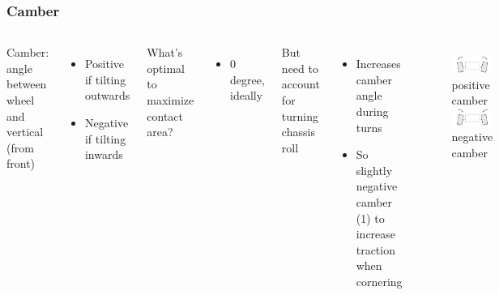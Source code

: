 \documentclass{beamer}
\begin{document}
\begin{frame}
\frametitle{Camber}
\begin{columns}[t]
  Camber: angle between wheel and vertical (from front)
  \begin{itemize}
    \item Positive if tilting outwards
    \item Negative if tilting inwards
  \end{itemize}
  \vspace{\baselineskip}
  What's optimal to maximize contact area?
   {
  \begin{itemize}
    \item 0 degree, ideally
  \end{itemize}
  \vspace{\baselineskip}
  But need to account for turning chassis roll
  }
   {
  \begin{itemize}
    \item Increases camber angle during turns
    \item So slightly negative camber (1\textdegree) to increase traction when cornering
  \end{itemize}
  }
  \begin{figure}
    \centering
     {
    \includegraphics[scale=0.3]{images-dis12/car-camber-pos} \\
    positive camber \\
    \vspace{\baselineskip}
    \includegraphics[scale=0.3]{images-dis12/car-camber-neg} \\
    negative camber
    }
     {
}
\end{figure}
\end{columns}
\end{frame}
\end{document}

